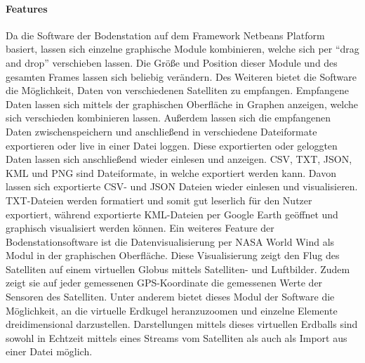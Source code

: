 \paragraph{Features}
Da die Software der Bodenstation auf dem Framework Netbeans Platform basiert, lassen sich einzelne graphische Module kombinieren, welche sich per ``drag and drop'' verschieben lassen. Die Größe und Position dieser Module und des gesamten Frames lassen sich beliebig verändern. Des Weiteren bietet die Software die Möglichkeit, Daten von verschiedenen Satelliten zu empfangen. Empfangene Daten lassen sich mittels der graphischen Oberfläche in Graphen anzeigen, welche sich verschieden kombinieren lassen. Außerdem lassen sich die empfangenen Daten zwischenspeichern und anschließend in verschiedene Dateiformate exportieren oder live in einer Datei loggen. Diese exportierten oder geloggten Daten lassen sich anschließend wieder einlesen und anzeigen. CSV, TXT, JSON, KML und PNG sind Dateiformate, in welche exportiert werden kann. Davon lassen sich exportierte CSV- und JSON Dateien wieder einlesen und visualisieren. TXT-Dateien werden formatiert und somit gut leserlich für den Nutzer exportiert, während exportierte KML-Dateien per Google Earth geöffnet und graphisch visualisiert werden können. Ein weiteres Feature der Bodenstationsoftware ist die Datenvisualisierung per NASA World Wind als Modul in der graphischen Oberfläche. Diese Visualisierung zeigt den Flug des Satelliten auf einem virtuellen Globus mittels Satelliten- und Luftbilder. Zudem zeigt sie auf jeder gemessenen GPS-Koordinate die gemessenen Werte der Sensoren des Satelliten. Unter anderem bietet dieses Modul der Software die Möglichkeit, an die virtuelle Erdkugel heranzuzoomen und einzelne Elemente dreidimensional darzustellen. Darstellungen mittels dieses virtuellen Erdballs sind sowohl in Echtzeit mittels eines Streams vom Satelliten als auch als Import aus einer Datei möglich.
